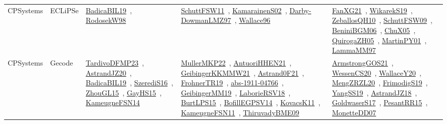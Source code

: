 {\begin{longtable}{lp{3cm}>{\raggedright\arraybackslash}p{6cm}>{\raggedright\arraybackslash}p{6cm}>{\raggedright\arraybackslash}p{8cm}}
CPSystems & ECLiPSe & \href{papers/BadicaBIL19.pdf}{BadicaBIL19}~\cite{BadicaBIL19}, \href{papers/RodosekW98.pdf}{RodosekW98}~\cite{RodosekW98} & \href{articles/SchuttFSW11.pdf}{SchuttFSW11}~\cite{SchuttFSW11}, \href{papers/KamarainenS02.pdf}{KamarainenS02}~\cite{KamarainenS02}, \href{articles/Darby-DowmanLMZ97.pdf}{Darby-DowmanLMZ97}~\cite{Darby-DowmanLMZ97}, \href{articles/Wallace96.pdf}{Wallace96}~\cite{Wallace96} & \href{articles/FanXG21.pdf}{FanXG21}~\cite{FanXG21}, \href{articles/WikarekS19.pdf}{WikarekS19}~\cite{WikarekS19}, \href{articles/ZeballosQH10.pdf}{ZeballosQH10}~\cite{ZeballosQH10}, \href{papers/SchuttFSW09.pdf}{SchuttFSW09}~\cite{SchuttFSW09}, \href{papers/BeniniBGM06.pdf}{BeniniBGM06}~\cite{BeniniBGM06}, \href{papers/ChuX05.pdf}{ChuX05}~\cite{ChuX05}, \href{papers/QuirogaZH05.pdf}{QuirogaZH05}~\cite{QuirogaZH05}, \href{articles/MartinPY01.pdf}{MartinPY01}~\cite{MartinPY01}, \href{articles/LammaMM97.pdf}{LammaMM97}~\cite{LammaMM97}\\
CPSystems & Gecode & \href{papers/TardivoDFMP23.pdf}{TardivoDFMP23}~\cite{TardivoDFMP23}, \href{articles/AstrandJZ20.pdf}{AstrandJZ20}~\cite{AstrandJZ20}, \href{papers/BadicaBIL19.pdf}{BadicaBIL19}~\cite{BadicaBIL19}, \href{papers/SzerediS16.pdf}{SzerediS16}~\cite{SzerediS16}, \href{papers/ZhouGL15.pdf}{ZhouGL15}~\cite{ZhouGL15}, \href{papers/GayHS15.pdf}{GayHS15}~\cite{GayHS15}, \href{articles/KameugneFSN14.pdf}{KameugneFSN14}~\cite{KameugneFSN14} & \href{articles/MullerMKP22.pdf}{MullerMKP22}~\cite{MullerMKP22}, \href{papers/AntuoriHHEN21.pdf}{AntuoriHHEN21}~\cite{AntuoriHHEN21}, \href{papers/GeibingerKKMMW21.pdf}{GeibingerKKMMW21}~\cite{GeibingerKKMMW21}, \href{papers/Astrand0F21.pdf}{Astrand0F21}~\cite{Astrand0F21}, \href{papers/FrohnerTR19.pdf}{FrohnerTR19}~\cite{FrohnerTR19}, \href{articles/abs-1911-04766.pdf}{abs-1911-04766}~\cite{abs-1911-04766}, \href{papers/GeibingerMM19.pdf}{GeibingerMM19}~\cite{GeibingerMM19}, \href{articles/LaborieRSV18.pdf}{LaborieRSV18}~\cite{LaborieRSV18}, \href{papers/BurtLPS15.pdf}{BurtLPS15}~\cite{BurtLPS15}, \href{papers/BofillEGPSV14.pdf}{BofillEGPSV14}~\cite{BofillEGPSV14}, \href{articles/KovacsK11.pdf}{KovacsK11}~\cite{KovacsK11}, \href{papers/KameugneFSN11.pdf}{KameugneFSN11}~\cite{KameugneFSN11}, \href{papers/ThiruvadyBME09.pdf}{ThiruvadyBME09}~\cite{ThiruvadyBME09} & \href{papers/ArmstrongGOS21.pdf}{ArmstrongGOS21}~\cite{ArmstrongGOS21}, \href{papers/WessenCS20.pdf}{WessenCS20}~\cite{WessenCS20}, \href{articles/WallaceY20.pdf}{WallaceY20}~\cite{WallaceY20}, \href{articles/MengZRZL20.pdf}{MengZRZL20}~\cite{MengZRZL20}, \href{papers/FrimodigS19.pdf}{FrimodigS19}~\cite{FrimodigS19}, \href{papers/YangSS19.pdf}{YangSS19}~\cite{YangSS19}, \href{papers/AstrandJZ18.pdf}{AstrandJZ18}~\cite{AstrandJZ18}, \href{papers/GoldwaserS17.pdf}{GoldwaserS17}~\cite{GoldwaserS17}, \href{papers/PesantRR15.pdf}{PesantRR15}~\cite{PesantRR15}, \href{papers/MonetteDD07.pdf}{MonetteDD07}~\cite{MonetteDD07}\\

\end{longtable}}
